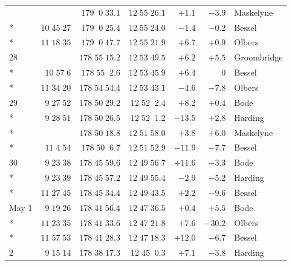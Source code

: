 \begin{longtable}{lrrrrrl}
 &  & $179\;\;0\;33.1$ & $12\;55\;26.1$ & $+1.1$ & $-3.9$ & Maskelyne \\*
 & $10\;45\;27$ & $179\;\;0\;25.4$ & $12\;55\;24.0$ & $-1.4$ & $-0.2$ & Bessel \\*
 & $11\;18\;35$ & $179\;\;0\;17.7$ & $12\;55\;21.9$ & $+6.7$ & $+0.9$ & Olbers \\
28 &  & $178\;55\;15.2$ & $12\;53\;49.5$ & $+6.2$ & $+5.5$ & Groombridge \\*
 & $10\;57\;6$ & $178\;55\;\;2.6$ & $12\;53\;45.9$ & $+6.4$ & $0$ & Bessel \\*
 & $11\;34\;20$ & $178\;54\;54.4$ & $12\;53\;43.1$ & $-4.6$ & $-7.8$ & Olbers \\
29 & $9\;27\;52$ & $178\;50\;29.2$ & $12\;52\;\;2.4$ & $+8.2$ & $+0.4$ & Bode \\*
 & $9\;28\;51$ & $178\;50\;26.5$ & $12\;52\;\;1.2$ & $-13.5$ & $+2.8$ & Harding \\*
 &  & $178\;50\;18.8$ & $12\;51\;58.0$ & $+3.8$ & $+6.0$ & Maskelyne \\*
 & $11\;4\;54$ & $178\;50\;\;6.7$ & $12\;51\;52.9$ & $-11.9$ & $-7.7$ & Bessel \\
30 & $9\;23\;38$ & $178\;45\;59.6$ & $12\;49\;56\;7$ & $+11.6$ & $-3.3$ & Bode \\*
 & $9\;23\;39$ & $178\;45\;57.2$ & $12\;49\;55.4$ & $-2.9$ & $-5.2$ & Harding \\*
 & $11\;27\;45$ & $178\;45\;34.4$ & $12\;49\;43.5$ & $+2.2$ & $-9.6$ & Bessel \\
May 1 & $9\;19\;26$ & $178\;41\;56.4$ & $12\;47\;36.5$ & $+0.4$ & $+5.5$ & Bode \\*
 & $11\;23\;35$ & $178\;41\;33.6$ & $12\;47\;21.8$ & $+7.6$ & $-30.2$ & Olbers \\*
 & $11\;57\;53$ & $178\;41\;28.3$ & $12\;47\;18.3$ & $+12.0$ & $-6.7$ & Bessel \\
2 & $9\;15\;14$ & $178\;38\;17.3$ & $12\;45\;\;0.3$ & $+7.1$ & $-3.8$ & Harding \\
\end{longtable}
\endgroup

